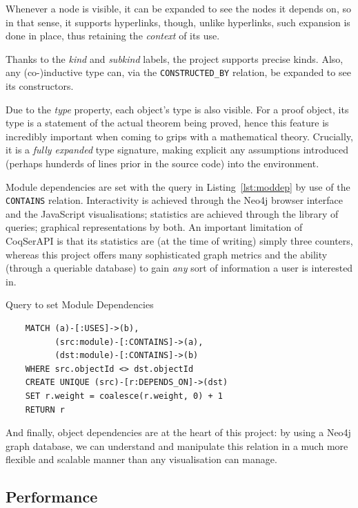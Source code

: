 Whenever a node is visible, it can be expanded to see the nodes it depends on,
so in that sense, it supports hyperlinks, though, unlike hyperlinks, such
expansion is done in place, thus retaining the \emph{context} of its use.

Thanks to the \emph{kind} and \emph{subkind} labels, the project supports
precise kinds.  Also, any (co-)inductive type can, via the
\texttt{CONSTRUCTED\_BY} relation, be expanded to see its constructors. 

Due to the \emph{type} property, each object's type is also visible. For a proof
object, its type is a statement of the actual theorem being proved, hence this
feature is incredibly important when coming to grips with a mathematical theory.
Crucially, it is a \emph{fully expanded} type signature, making explicit any
assumptions introduced (perhaps hunderds of lines prior in the source code) into
the environment.

Module dependencies are set with the query in Listing~\ref{lst:moddep} by use of
the \texttt{CONTAINS} relation.  Interactivity is achieved through the Neo4j
browser interface and the JavaScript visualisations; statistics are achieved
through the library of queries; graphical representations by both. An important
limitation of CoqSerAPI is that its statistics are (at the time of writing)
simply three counters, whereas this project offers many sophisticated graph
metrics and the ability (through a queriable database) to gain \emph{any} sort
of information a user is interested in.

\begin{listing}[p]%

\caption{Query to set Module Dependencies}\label{lst:moddep}

  \begin{verbatim}
    MATCH (a)-[:USES]->(b),
          (src:module)-[:CONTAINS]->(a),
          (dst:module)-[:CONTAINS]->(b)
    WHERE src.objectId <> dst.objectId
    CREATE UNIQUE (src)-[r:DEPENDS_ON]->(dst)
    SET r.weight = coalesce(r.weight, 0) + 1
    RETURN r
  \end{verbatim}

\end{listing}

And finally, object dependencies are at the heart of this project: by using a
Neo4j graph database, we can understand and manipulate this relation in a much
more flexible and scalable manner than any visualisation can manage.

\subsection{Performance}

